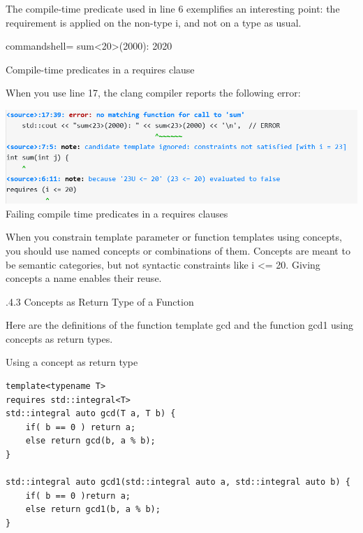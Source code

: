 The compile-time predicate used in line 6 exemplifies an interesting point: the requirement is applied on the non-type i, and not on a type as usual.

\begin{tcblisting}{commandshell={}}
sum<20>(2000): 2020
\end{tcblisting}

\begin{center}
Compile-time predicates in a requires clause
\end{center}

When you use line 17, the clang compiler reports the following error:

\begin{center}
\includegraphics[width=1.0\textwidth]{content/3/chapter4/images/1-2.png}\\
Failing compile time predicates in a requires clauses
\end{center}

\begin{tcolorbox}[colback=blue!5!white,colframe=blue!75!black,title=Avoid Compile-Time Predicates in Requires Clauses]
When you constrain template parameter or function templates using concepts, you should use named concepts or combinations of them. Concepts are meant to be semantic categories, but not syntactic constraints like i <= 20. Giving concepts a name enables their reuse.
\end{tcolorbox}

.4.3\hspace{0.2cm} Concepts as Return Type of a Function

Here are the definitions of the function template gcd and the function gcd1 using concepts as return types.

\noindent
Using a concept as return type
\begin{lstlisting}[style=styleCXX]
template<typename T>
requires std::integral<T>
std::integral auto gcd(T a, T b) {
	if( b == 0 ) return a;
	else return gcd(b, a % b);
}

std::integral auto gcd1(std::integral auto a, std::integral auto b) {
	if( b == 0 )return a;
	else return gcd1(b, a % b);
}
\end{lstlisting}

